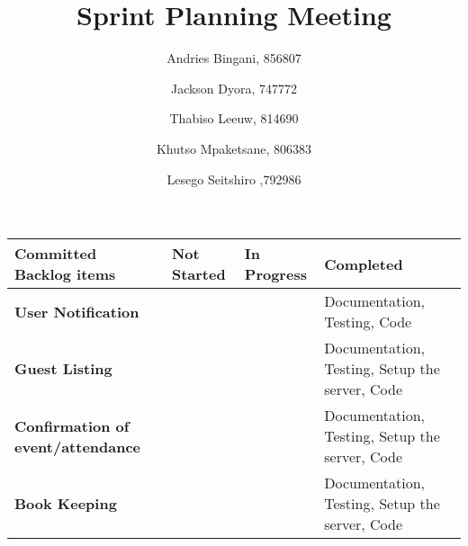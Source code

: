\documentclass[10pt,a4paper]{article}
\title{Sprint Planning Meeting}
\author{
  Andries Bingani, 856807 \and
  Jackson Dyora, 747772\and
  Thabiso Leeuw, 814690 \and
  Khutso Mpaketsane, 806383 \and
  Lesego Seitshiro ,792986
}
\begin{document}
\maketitle



\begin{center}
\begin{tabular}{ || m{4cm} | m{4cm}| m{4cm} |m{3.5cm} || } 
\hline
\hline
\textbf{Committed Backlog items} & \textbf{Not Started} & \textbf{In Progress} & \textbf{Completed} \\ 
\hline
\hline
\textbf{User Notification} &  &  & Documentation, Testing, Code\\ 
\hline
\textbf{Guest Listing} &  &  & Documentation, Testing, Setup the server, Code\\ 
\hline
\textbf{Confirmation of event/attendance} & &  & Documentation, Testing, Setup the server, Code  \\ 
\hline
\textbf{Book Keeping} & &  &  Documentation, Testing, Setup the server, Code  \\ 
\hline
\hline
\end{tabular}
\end{center}
\end{document}
